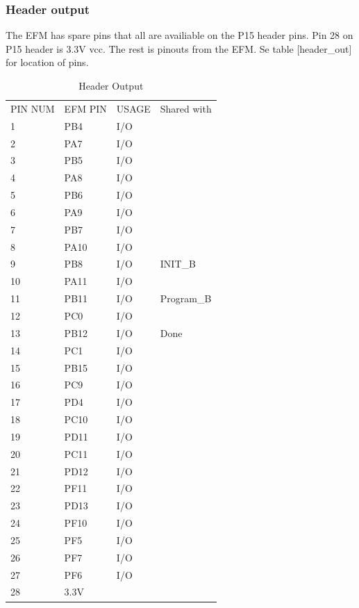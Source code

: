 \subsubsection{Header output}
The EFM has spare pins that all are availiable on the P15 header pins. Pin 28 on P15 header is 3.3V vcc. The rest is pinouts from the EFM. Se table [header\_out] for location of pins.
\begin{table}[]
    \centering
    \caption{Header Output}
    \label{header_out}
    \begin{tabular}{llll}
        PIN NUM & EFM PIN & USAGE & Shared with \\
        1       & PB4     & I/O   &             \\
        2       & PA7     & I/O   &             \\
        3       & PB5     & I/O   &             \\
        4       & PA8     & I/O   &             \\
        5       & PB6     & I/O   &             \\
        6       & PA9     & I/O   &             \\
        7       & PB7     & I/O   &             \\
        8       & PA10    & I/O   &             \\
        9       & PB8     & I/O   & INIT\_B     \\
        10      & PA11    & I/O   &             \\
        11      & PB11    & I/O   & Program\_B  \\
        12      & PC0     & I/O   &             \\
        13      & PB12    & I/O   & Done        \\
        14      & PC1     & I/O   &             \\
        15      & PB15    & I/O   &             \\
        16      & PC9     & I/O   &             \\
        17      & PD4     & I/O   &             \\
        18      & PC10    & I/O   &             \\
        19      & PD11    & I/O   &             \\
        20      & PC11    & I/O   &             \\
        21      & PD12    & I/O   &             \\
        22      & PF11    & I/O   &             \\
        23      & PD13    & I/O   &             \\
        24      & PF10    & I/O   &             \\
        25      & PF5     & I/O   &             \\
        26      & PF7     & I/O   &             \\
        27      & PF6     & I/O   &             \\
        28      & 3.3V    &       &
    \end{tabular}
\end{table}

